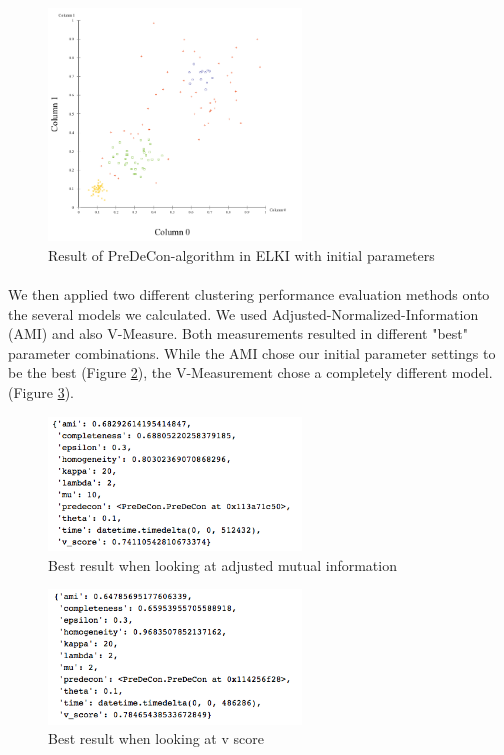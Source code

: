 \documentclass[a4paper]{article}
\begin{document}
\begin{figure}
	\centering
	\includegraphics[width=0.6\textwidth]{elki_init_paramt.png}
	\caption{ Result of PreDeCon-algorithm in ELKI with initial parameters}
    \label{fig:elki_init_paramt}
\end{figure}
\paragraph{}
We then applied two different clustering performance evaluation methods onto the several models we calculated. We used Adjusted-Normalized-Information (AMI) and also V-Measure. Both measurements resulted in different "best" parameter combinations. While the AMI chose our initial parameter settings to be the best (Figure \ref{fig:ami_dict}), the V-Measurement chose a completely different model. (Figure \ref{fig:v_score_dict}). 

\begin{figure}
	\label{fig:ami_dict}
	\centering
	\includegraphics[width=0.6\textwidth]{ami_dict.png}
	\caption{Best result when looking at adjusted mutual information}
\end{figure}

\begin{figure}
	\centering
	\includegraphics[width=0.6\textwidth]{v_score_dict.png}
	\caption{Best result when looking at v score}
    \label{fig:v_score_dict}
\end{figure}
\end{document}
